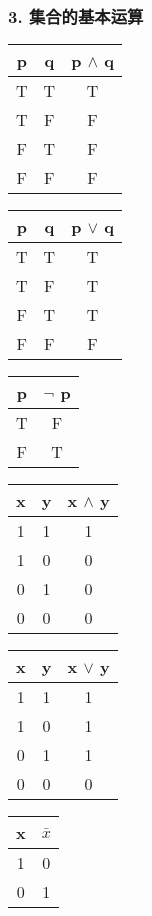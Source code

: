 \documentclass{beamer}
\begin{document}
\begin{CJK*}{UTF8}{gbsn}
\begin{frame}
  \frametitle{3. 集合的基本运算}
  \begin{tabular}{cc|c}
    p& q& p $\land$ q\\
    \hline
    T&T&T\\
    T&F&F\\
    F&T&F\\
    F&F&F\\
  \end{tabular}\hspace{1cm}
  \begin{tabular}{cc|c}
    p& q& p $\lor$ q\\
    \hline
    T&T&T\\
    T&F&T\\
    F&T&T\\
    F&F&F\\
  \end{tabular}\hspace{1cm}
  \begin{tabular}{c|c}
    p& $\lnot$ p\\
    \hline
    T&F\\
    F&T\\
  \end{tabular}

  \vspace{1cm}\pause
    \begin{tabular}{cc|c}
    x& y& x $\land$ y\\
    \hline
    1&1&1\\
    1&0&0\\
    0&1&0\\
    0&0&0\\
  \end{tabular}\hspace{1cm}
  \begin{tabular}{cc|c}
    x& y& x $\lor$ y\\
    \hline
    1&1&1\\
    1&0&1\\
    0&1&1\\
    0&0&0\\
  \end{tabular}\hspace{1cm}
  \begin{tabular}{c|c}
    x& $\bar{x}$\\
    \hline
    1&0\\
    0&1\\
  \end{tabular}


\end{frame}
\end{CJK*}
\end{document}
